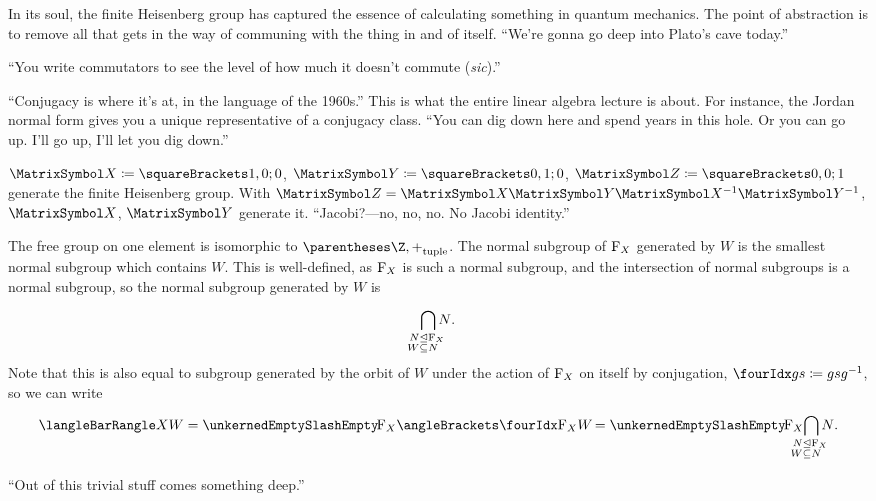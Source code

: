 \documentclass[10pt, a4paper, twoside]{lecturenotes}
\begin{document}
In its soul, the finite Heisenberg group has captured the essence of calculating something in quantum mechanics. The point of abstraction is to remove all that gets in the way of communing with the thing in and of itself. 
``We're gonna go deep into Plato's cave today.''

``You write commutators to see the level of how much it doesn't commute (\emph{sic}).''

 ``Conjugacy is where it's at, in the language of the 1960s.'' This is what the entire linear algebra lecture is about. For instance, the Jordan normal form gives you a unique representative of a conjugacy class. ``You can dig down here and spend years in this hole. Or you can go up. I'll go up, I'll let you dig down.''

$\matX\DefineAs\Helt 1 0 0$, $\matY\DefineAs\Helt 0 1 0$, $\matZ\DefineAs\Helt 0 0 1$ generate the finite Heisenberg group. With $\matZ=\matX\matY\matX^{-1}\matY^{-1}$, $\matX$, $\matY$ generate it. ``Jacobi?---no, no, no. No Jacobi identity.'' 

The free group on one element is isomorphic to $\tuple{\Z,+}$. The normal subgroup of $\operatorname{F}_{X}$ generated by $W$ is the smallest normal subgroup which contains $W$. This is well-defined, as $\operatorname{F}_{X}$ is such a normal subgroup, and the intersection of normal subgroups is a normal subgroup, so the normal subgroup generated by $W$ is
\begin{equation*}
  \IntersectionOver {
    \LongDomainSpec{
      \mathllap{N\NormalSubgroup} \mathrlap{\FreeGroup X}\\
      \mathllap{W\Subset} \mathrlap{N}
    }
  } N\text{.}
\end{equation*}
Note that this is also equal to subgroup generated by the orbit of $W$ under the action of $\operatorname{F}_{X}$ on itself by conjugation, $\LeftConjugationAction g s \DefineAs g s g^{-1}$, so we can write
\begin{equation*}
\GroupPresentation{X}{W} = \QuotientGroup{\FreeGroup X}{\GroupGeneratedBy{\LeftConjugationAction {\FreeGroup X} W}} = \QuotientGroup{\FreeGroup X}{
  \IntersectionOver {
    \LongDomainSpec{
      \mathllap{N\NormalSubgroup} \mathrlap{\FreeGroup X}\\
      \mathllap{W\Subset} \mathrlap{N}
    }
  } N\text{.}
}
\end{equation*}

``Out of this trivial stuff comes something deep.''
\end{document}

